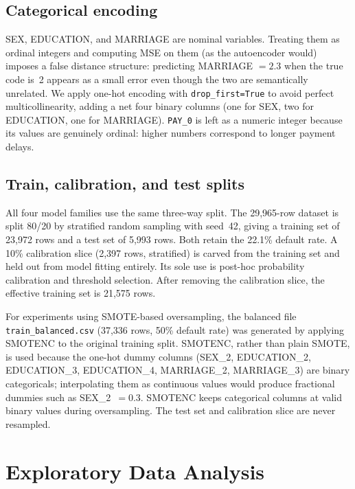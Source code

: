 \documentclass[12pt,a4paper]{article}
\begin{document}
\subsection{Categorical encoding}

SEX, EDUCATION, and MARRIAGE are nominal variables. Treating them as
ordinal integers and computing MSE on them (as the autoencoder would) imposes
a false distance structure: predicting MARRIAGE $= 2.3$ when the true code
is~2 appears as a small error even though the two are semantically unrelated.
We apply one-hot encoding with \texttt{drop\_first=True} to avoid perfect
multicollinearity, adding a net four binary columns (one for SEX, two for
EDUCATION, one for MARRIAGE). \texttt{PAY\_0} is left as a numeric integer
because its values are genuinely ordinal: higher numbers correspond to longer
payment delays.

\subsection{Train, calibration, and test splits}

All four model families use the same three-way split. The 29,965-row dataset
is split 80/20 by stratified random sampling with seed~42, giving a training
set of 23,972 rows and a test set of 5,993 rows. Both retain the 22.1\%
default rate. A 10\% calibration slice (2,397 rows, stratified) is carved
from the training set and held out from model fitting entirely. Its sole use
is post-hoc probability calibration and threshold selection. After removing
the calibration slice, the effective training set is 21,575 rows.

For experiments using SMOTE-based oversampling, the balanced file
\texttt{train\_balanced.csv} (37,336 rows, 50\% default rate) was generated
by applying SMOTENC to the original training split. SMOTENC, rather than
plain SMOTE, is used because the one-hot dummy columns (SEX\_2,
EDUCATION\_2, EDUCATION\_3, EDUCATION\_4, MARRIAGE\_2, MARRIAGE\_3) are
binary categoricals; interpolating them as continuous values would produce
fractional dummies such as SEX\_2~$= 0.3$. SMOTENC keeps categorical columns
at valid binary values during oversampling. The test set and calibration slice
are never resampled.

\section{Exploratory Data Analysis}
\end{document}

